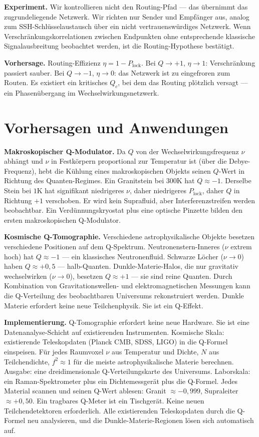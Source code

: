 \documentclass[12pt]{article}
\begin{document}
\textbf{Experiment.} Wir kontrollieren nicht den Routing-Pfad — das übernimmt das zugrundeliegende Netzwerk. Wir richten nur Sender und Empfänger aus, analog zum SSH-Schlüsselaustausch über ein nicht vertrauenswürdiges Netzwerk. Wenn Verschränkungskorrelationen zwischen Endpunkten ohne entsprechende klassische Signalausbreitung beobachtet werden, ist die Routing-Hypothese bestätigt.

\textbf{Vorhersage.} Routing-Effizienz $\eta = 1 - P_{\text{lock}}$. Bei $Q \to +1$, $\eta \to 1$: Verschränkung passiert sauber. Bei $Q \to -1$, $\eta \to 0$: das Netzwerk ist zu eingefroren zum Routen. Es existiert ein kritisches $Q_c$, bei dem das Routing plötzlich versagt — ein Phasenübergang im Wechselwirkungsnetzwerk.

\section{Vorhersagen und Anwendungen}

\textbf{Makroskopischer Q-Modulator.} Da $Q$ von der Wechselwirkungsfrequenz $\nu$ abhängt und $\nu$ in Festkörpern proportional zur Temperatur ist (über die Debye-Frequenz), hebt die Kühlung eines makroskopischen Objekts seinen $Q$-Wert in Richtung des Quanten-Regimes. Ein Granitstein bei $300\text{K}$ hat $Q \approx -1$. Derselbe Stein bei $1\text{K}$ hat signifikant niedrigeres $\nu$, daher niedrigeres $P_{\text{lock}}$, daher $Q$ in Richtung $+1$ verschoben. Er wird kein Suprafluid, aber Interferenzstreifen werden beobachtbar. Ein Verdünnungskryostat plus eine optische Pinzette bilden den ersten makroskopischen Q-Modulator.

\textbf{Kosmische Q-Tomographie.} Verschiedene astrophysikalische Objekte besetzen verschiedene Positionen auf dem Q-Spektrum. Neutronenstern-Inneres ($\nu$ extrem hoch) hat $Q \approx -1$ — ein klassisches Neutronenfluid. Schwarze Löcher ($\nu \to 0$) haben $Q \approx +0{,}5$ — halb-Quanten. Dunkle-Materie-Halos, die nur gravitativ wechselwirken ($\nu \to 0$), besetzen $Q \approx +1$ — sie sind reine Quanten. Durch Kombination von Gravitationswellen- und elektromagnetischen Messungen kann die Q-Verteilung des beobachtbaren Universums rekonstruiert werden. Dunkle Materie erfordert keine neue Teilchenphysik. Sie ist ein Q-Effekt.

\textbf{Implementierung.} Q-Tomographie erfordert keine neue Hardware. Sie ist eine Datenanalyse-Schicht auf existierenden Instrumenten. Kosmische Skala: existierende Teleskopdaten (Planck CMB, SDSS, LIGO) in die Q-Formel einspeisen. Für jedes Raumvoxel $\nu$ aus Temperatur und Dichte, $N$ aus Teilchendichte, $f^2 \approx 1$ für die meiste astrophysikalische Materie berechnen. Ausgabe: eine dreidimensionale Q-Verteilungskarte des Universums. Laborskala: ein Raman-Spektrometer plus ein Dichtemessgerät plus die Q-Formel. Jedes Material scannen und seinen Q-Wert ablesen: Granit $\approx -0{,}999$, Supraleiter $\approx +0{,}50$. Ein tragbares Q-Meter ist ein Tischgerät. Keine neuen Teilchendetektoren erforderlich. Alle existierenden Teleskopdaten durch die Q-Formel neu analysieren, und die Dunkle-Materie-Regionen lösen sich automatisch auf.
\end{document}
